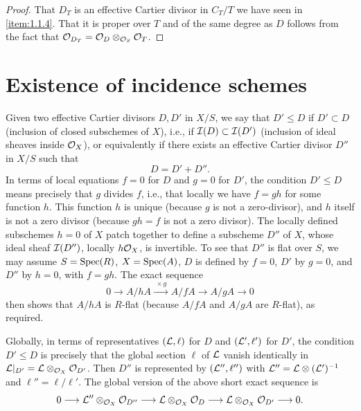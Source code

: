 \begin{proof}
That $D_T$ is an effective Cartier divisor in $C_T/T$ we have seen in \ref{item:1.1.4}. That it is proper over $T$ and of the same degree as $D$ follows from the fact that $\mathcal{O}_{D_T} = \mathcal{O}_D \otimes_{\mathcal{O}_S} \mathcal{O}_T$.
\end{proof}

\section{Existence of incidence schemes}
\label{sec:1.3}

\kmitem\label{item:1.3.1}
Given two effective Cartier divisors $D, D'$ in $X/S$, we say that $D' \le D$ if $D' \subset D$ (inclusion of closed subschemes of $X$), i.e., if $\mathcal{I}(D) \subset \mathcal{I}(D')$ (inclusion of ideal sheaves inside $\mathcal{O}_X$), or equivalently if there exists an effective Cartier divisor $D''$ in $X/S$ such that
\[
D = D' + D''.
\]
In terms of local equations $f = 0$ for $D$ and $g = 0$ for $D'$, the condition $D' \le D$ means precisely that $g$ divides $f$, i.e., that locally we have $f = gh$ for some function $h$. This function $h$ is unique (because $g$ is not a zero-divisor), and $h$ itself is not a zero divisor (because $gh = f$ is not a zero divisor). The locally defined subschemes $h = 0$ of $X$ patch together to define a subscheme $D''$ of $X$, whose ideal sheaf $\mathcal{I}(D'')$, locally $h\mathcal{O}_X$, is invertible. To see that $D''$ is flat over $S$, we may assume $S = \operatorname{Spec}(R)$, $X = \operatorname{Spec}(A)$, $D$ is defined by $f = 0$, $D'$ by $g = 0$, and $D''$ by $h = 0$, with $f = gh$. The exact sequence
\[
0 \longrightarrow A/hA \xrightarrow{\;\times g\;} A/fA \longrightarrow A/gA \longrightarrow 0
\]
then shows that $A/hA$ is $R$-flat (because $A/fA$ and $A/gA$ are $R$-flat), as required.

Globally, in terms of representatives $(\mathcal{L}, \ell)$ for $D$ and $(\mathcal{L}', \ell')$ for $D'$, the condition $D' \le D$ is precisely that the global section $\ell$ of $\mathcal{L}$ vanish identically in $\mathcal{L}|_{D'} = \mathcal{L} \otimes_{\mathcal{O}_X} \mathcal{O}_{D'}$. Then $D''$ is represented by $(\mathcal{L}'', \ell'')$ with $\mathcal{L}'' = \mathcal{L} \otimes (\mathcal{L}')^{-1}$ and $\ell'' = \ell/\ell'$. The global version of the above short exact sequence is
\begin{equation}\label{eq:1.3.1.1}
0 \longrightarrow \mathcal{L}'' \otimes_{\mathcal{O}_X} \mathcal{O}_{D''} \longrightarrow \mathcal{L} \otimes_{\mathcal{O}_X} \mathcal{O}_D \longrightarrow \mathcal{L} \otimes_{\mathcal{O}_X} \mathcal{O}_{D'} \longrightarrow 0.
\end{equation}

